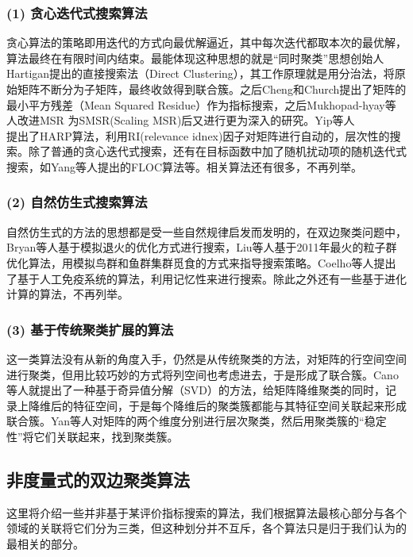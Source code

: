 \subsubsection*{(1) 贪心迭代式搜索算法}
贪心算法的策略即用迭代的方式向最优解逼近，其中每次迭代都取本次的最优解，算法最终在有限时间内结束。最能体现这种思想的就是“同时聚类”思想创始人Hartigan提出的直接搜索法（Direct Clustering），其工作原理就是用分治法，将原始矩阵不断分为子矩阵，最终收敛得到联合簇。之后Cheng和Church提出了矩阵的最小平方残差（Mean Squared Residue）作为指标搜索，之后Mukhopad-hyay等人改进MSR 为SMSR(Scaling MSR)后又进行更为深入的研究。Yip等人\\提出了HARP算法，利用RI(relevance idnex)因子对矩阵进行自动的，层次性的搜索。除了普通的贪心迭代式搜索，还有在目标函数中加了随机扰动项的随机迭代式搜索，如Yang等人提出的FLOC算法等。相关算法还有很多，不再列举。

\subsubsection*{(2) 自然仿生式搜索算法}
自然仿生式的方法的思想都是受一些自然规律启发而发明的，在双边聚类问题中，Bryan等人基于模拟退火的优化方式进行搜索，Liu等人基于2011年最火的粒子群优化算法，用模拟鸟群和鱼群集群觅食的方式来指导搜索策略。Coelho等人提出了基于人工免疫系统的算法，利用记忆性来进行搜索。除此之外还有一些基于进化计算的算法，不再列举。

\subsubsection*{(3) 基于传统聚类扩展的算法}
这一类算法没有从新的角度入手，仍然是从传统聚类的方法，对矩阵的行空间空间进行聚类，但用比较巧妙的方式将列空间也考虑进去，于是形成了联合簇。Cano等人就提出了一种基于奇异值分解（SVD）的方法，给矩阵降维聚类的同时，记录上降维后的特征空间，于是每个降维后的聚类簇都能与其特征空间关联起来形成联合簇。Yan等人对矩阵的两个维度分别进行层次聚类，然后用聚类簇的“稳定性”将它们关联起来，找到聚类簇。

\subsection{非度量式的双边聚类算法}
\label{nonsearch}
这里将介绍一些并非基于某评价指标搜索的算法，我们根据算法最核心部分与各个领域的关联将它们分为三类，但这种划分并不互斥，各个算法只是归于我们认为的最相关的部分。


